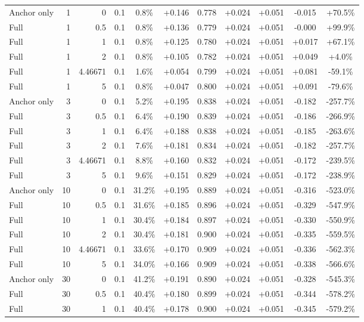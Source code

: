 \begin{table}[htbp]
\begin{tabular}{lrrrccccccc}
Anchor only & 1 & 0 & 0.1 & 0.8\% & +0.146 & 0.778 & +0.024 & +0.051 & -0.015 & +70.5\% \\
Full & 1 & 0.5 & 0.1 & 0.8\% & +0.136 & 0.779 & +0.024 & +0.051 & -0.000 & +99.9\% \\
Full & 1 & 1 & 0.1 & 0.8\% & +0.125 & 0.780 & +0.024 & +0.051 & +0.017 & +67.1\% \\
Full & 1 & 2 & 0.1 & 0.8\% & +0.105 & 0.782 & +0.024 & +0.051 & +0.049 & +4.0\% \\
Full & 1 & 4.46671 & 0.1 & 1.6\% & +0.054 & 0.799 & +0.024 & +0.051 & +0.081 & -59.1\% \\
Full & 1 & 5 & 0.1 & 0.8\% & +0.047 & 0.800 & +0.024 & +0.051 & +0.091 & -79.6\% \\
Anchor only & 3 & 0 & 0.1 & 5.2\% & +0.195 & 0.838 & +0.024 & +0.051 & -0.182 & -257.7\% \\
Full & 3 & 0.5 & 0.1 & 6.4\% & +0.190 & 0.839 & +0.024 & +0.051 & -0.186 & -266.9\% \\
Full & 3 & 1 & 0.1 & 6.4\% & +0.188 & 0.838 & +0.024 & +0.051 & -0.185 & -263.6\% \\
Full & 3 & 2 & 0.1 & 7.6\% & +0.181 & 0.834 & +0.024 & +0.051 & -0.182 & -257.7\% \\
Full & 3 & 4.46671 & 0.1 & 8.8\% & +0.160 & 0.832 & +0.024 & +0.051 & -0.172 & -239.5\% \\
Full & 3 & 5 & 0.1 & 9.6\% & +0.151 & 0.829 & +0.024 & +0.051 & -0.172 & -238.9\% \\
Anchor only & 10 & 0 & 0.1 & 31.2\% & +0.195 & 0.889 & +0.024 & +0.051 & -0.316 & -523.0\% \\
Full & 10 & 0.5 & 0.1 & 31.6\% & +0.185 & 0.896 & +0.024 & +0.051 & -0.329 & -547.9\% \\
Full & 10 & 1 & 0.1 & 30.4\% & +0.184 & 0.897 & +0.024 & +0.051 & -0.330 & -550.9\% \\
Full & 10 & 2 & 0.1 & 30.4\% & +0.181 & 0.900 & +0.024 & +0.051 & -0.335 & -559.5\% \\
Full & 10 & 4.46671 & 0.1 & 33.6\% & +0.170 & 0.909 & +0.024 & +0.051 & -0.336 & -562.3\% \\
Full & 10 & 5 & 0.1 & 34.0\% & +0.166 & 0.909 & +0.024 & +0.051 & -0.338 & -566.6\% \\
Anchor only & 30 & 0 & 0.1 & 41.2\% & +0.191 & 0.890 & +0.024 & +0.051 & -0.328 & -545.3\% \\
Full & 30 & 0.5 & 0.1 & 40.4\% & +0.180 & 0.899 & +0.024 & +0.051 & -0.344 & -578.2\% \\
Full & 30 & 1 & 0.1 & 40.4\% & +0.178 & 0.900 & +0.024 & +0.051 & -0.345 & -579.2\% \\

\end{tabular}
\end{table}
